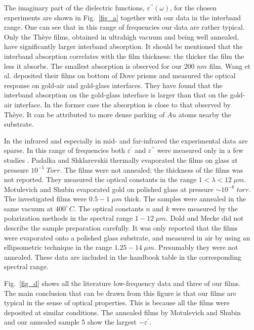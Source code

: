 \documentclass[prb]{revtex4}%
\begin{document}
The imaginary part of the dielectric functions,
$\varepsilon^{\prime\prime}(\omega)$, for the chosen experiments are
shown in Fig.~\ref{fig_a} together with our data in the interband
range. One can see that in this range of frequencies our data are
rather typical. Only the Th\`{e}ye films, obtained in ultrahigh
vacuum and being well annealed, have significantly larger interband
absorption. It should be mentioned that the interband absorption
correlates with the film thickness: the thicker the film the less it
absorbs. The smallest absorption is observed for our 200 $nm$ film.
Wang et al. \cite{Wan98} deposited their films on bottom of Dove
prisms and measured the optical response on gold-air and gold-glass
interfaces. They have found that the interband absorption on the
gold-glass interface is larger than that on the gold-air interface.
In the former case the absorption is close to that observed by
Th\`{e}ye. It can be attributed to more dense parking of $Au$ atoms
nearby the substrate.

In the infrared and especially in mid- and far-infrared the
experimental data are sparse. In this range of frequencies both
$\varepsilon^{\prime}$ and $\varepsilon^{\prime\prime}$ were
measured only in a few studies \cite{Pad61,Mot64,Dol65}. Padalka and
Shklarevskii \cite{Pad61} thermally evaporated the films on glass at
pressure $10^{-5}\;Torr$. The films were not annealed; the thickness
of the films was not reported. They measured the optical constants
in the range $1<\lambda<12\;\mu m$. Motulevich and Shubin
\cite{Mot64} evaporated gold on polished glass at pressure $\sim
10^{-6}\;torr$. The investigated films were $0.5-1\;\mu m$ thick.
The samples were annealed in the same vacuum at $400^{\circ }\,C$.
The optical constants $n$ and $k$ were measured by the polarization
methods in the spectral range $1-12\;\mu m$. Dold and Mecke did not
describe the sample preparation carefully. It was only reported
\cite{Dol65} that the films were evaporated onto a polished glass
substrate, and measured in air by using an ellipsometric technique
in the range $1.25-14\;\mu m$. Presumably they were not annealed.
These data are included in the handbook \cite{HB1} table  in the
corresponding spectral range.

Fig.~\ref{fig_d} shows all the literature low-frequency data and
three of our films. The main conclusion that can be drawn from this
figure is that our films are typical in the sense of optical
properties. This is because all the films were deposited at similar
conditions. The annealed films by Motulevich and Shubin \cite{Mot64}
and our annealed sample 5 show the largest $-\varepsilon^{\prime}$.
\end{document}
